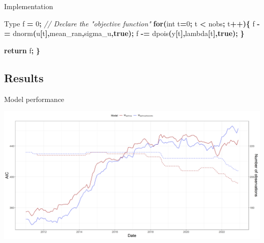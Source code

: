 \documentclass[aspectratio=169]{beamer}
\newenvironment{Shaded}{\begin{snugshade}}{\end{snugshade}}
\newcommand{\CommentTok}[1]{\textcolor[rgb]{0.56,0.35,0.01}{\textit{#1}}}
\newcommand{\ControlFlowTok}[1]{\textcolor[rgb]{0.13,0.29,0.53}{\textbf{#1}}}
\newcommand{\DataTypeTok}[1]{\textcolor[rgb]{0.13,0.29,0.53}{#1}}
\newcommand{\DecValTok}[1]{\textcolor[rgb]{0.00,0.00,0.81}{#1}}
\newcommand{\KeywordTok}[1]{\textcolor[rgb]{0.13,0.29,0.53}{\textbf{#1}}}
\newcommand{\NormalTok}[1]{#1}
\newcommand{\OperatorTok}[1]{\textcolor[rgb]{0.81,0.36,0.00}{\textbf{#1}}}
\begin{document}
\begin{frame}[fragile]{Implementation}
\begin{Shaded}
\begin{Highlighting}[]
\NormalTok{  Type f }\OperatorTok{=} \DecValTok{0}\OperatorTok{;}                           \CommentTok{// Declare the "objective function"}
  \ControlFlowTok{for}\OperatorTok{(}\DataTypeTok{int}\NormalTok{ t}\OperatorTok{=}\DecValTok{0}\OperatorTok{;}\NormalTok{ t }\OperatorTok{\textless{}}\NormalTok{ nobs}\OperatorTok{;}\NormalTok{ t}\OperatorTok{++)\{}
\NormalTok{    f }\OperatorTok{{-}=}\NormalTok{ dnorm}\OperatorTok{(}\NormalTok{u}\OperatorTok{[}\NormalTok{t}\OperatorTok{],}\NormalTok{mean\_ran}\OperatorTok{,}\NormalTok{sigma\_u}\OperatorTok{,}\KeywordTok{true}\OperatorTok{);}
\NormalTok{    f }\OperatorTok{{-}=}\NormalTok{ dpois}\OperatorTok{(}\NormalTok{y}\OperatorTok{[}\NormalTok{t}\OperatorTok{],}\NormalTok{lambda}\OperatorTok{[}\NormalTok{t}\OperatorTok{],}\KeywordTok{true}\OperatorTok{);}
  \OperatorTok{\}}
  
  \ControlFlowTok{return}\NormalTok{ f}\OperatorTok{;}
\OperatorTok{\}}
\end{Highlighting}
\end{Shaded}

\normalsize
\end{frame}

\hypertarget{results}{%
\subsection{Results}\label{results}}

\begin{frame}{Model performance}
\protect\hypertarget{model-performance}{}
\tiny

\includegraphics[width=1\linewidth]{../figures/AICxSTEC_PoisN}

\normalsize
\end{frame}
\end{document}
